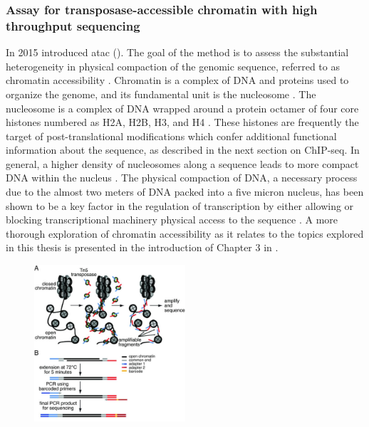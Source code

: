 \subsubsection{Assay for transposase-accessible chromatin with high throughput sequencing} \label{intro:atac}

In 2015 \textcite{Buenrostro2015a} introduced \gls{atac} (). The goal of the method is to assess the substantial heterogeneity in physical compaction of the genomic sequence, referred to as chromatin accessibility \cite{Thurman2012a}. Chromatin is a complex of DNA and proteins used to organize the genome, and its fundamental unit is the nucleosome \cite{Bell2011a}. The nucleosome is a complex of DNA wrapped around a protein octamer of four core histones numbered as H2A, H2B, H3, and H4 \cite{Bell2011a}. These histones are frequently the target of post-translational modifications which confer additional functional information about the sequence, as described in the next section on ChIP-seq. In general, a higher density of nucleosomes along a sequence leads to more compact DNA within the nucleus \cite{Kornberg1974}.  
The physical compaction of DNA, a necessary process due to the almost two meters of DNA packed into a five micron nucleus, has been shown to be a key factor in the regulation of transcription by either allowing or blocking transcriptional machinery physical access to the sequence \cite{Bell2011,Gross2003}. A more thorough exploration of chromatin accessibility as it relates to the topics explored in this thesis is presented in the introduction of Chapter 3 in . 

\begin{figure}
    \centering
    \includegraphics[width=0.5\textwidth]{plot/ch1/atac.jpg}
    \label{fig:atac}
\end{figure}

